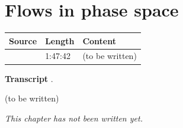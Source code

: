 \chapter{Flows in phase space}\label{ch:c20}
\begin{paracol}{2}

\begin{sources}
\begin{tabularx}{\linewidth}{@{}l l L@{}}
\toprule
\textbf{Source} & \textbf{Length} & \textbf{Content}\\
\midrule
{} & 1:47:42 & (to be written)\\
\bottomrule
\end{tabularx}

\smallskip
\textbf{Transcript} .
\end{sources}

\begin{reading}
(to be written)
\end{reading}

\emph{This chapter has not been written yet.}

\flushside
\end{paracol}
